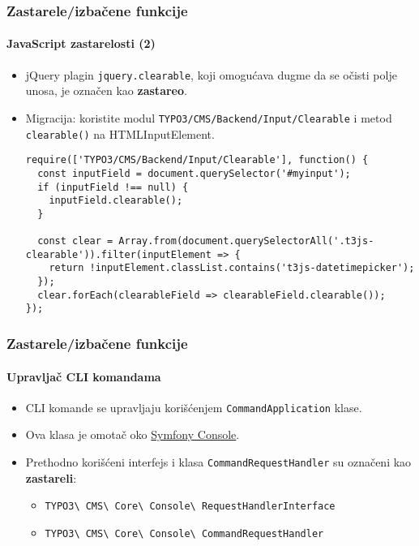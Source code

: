 
\begin{frame}[fragile]
	\frametitle{Zastarele/izbačene funkcije}
	\framesubtitle{JavaScript zastarelosti (2)}

	\lstset{basicstyle=\tiny\ttfamily}

	\begin{itemize}
		\item jQuery plagin \texttt{jquery.clearable}, koji omogućava dugme da se očisti
			polje unosa, je označen kao \textbf{zastareo}.
		\item Migracija: koristite modul \small\texttt{TYPO3/CMS/Backend/Input/Clearable}\normalsize 
			i metod \texttt{clearable()} na HTMLInputElement.

\begin{lstlisting}
require(['TYPO3/CMS/Backend/Input/Clearable'], function() {
  const inputField = document.querySelector('#myinput');
  if (inputField !== null) {
    inputField.clearable();
  }

  const clear = Array.from(document.querySelectorAll('.t3js-clearable')).filter(inputElement => {
    return !inputElement.classList.contains('t3js-datetimepicker');
  });
  clear.forEach(clearableField => clearableField.clearable());
});
\end{lstlisting}

	\end{itemize}

\end{frame}


\begin{frame}[fragile]
	\frametitle{Zastarele/izbačene funkcije}
	\framesubtitle{Upravljač CLI komandama}

	\begin{itemize}
		\item CLI komande se upravljaju korišćenjem \texttt{CommandApplication} klase.
		\item Ova klasa je omotač oko
			\href{https://symfony.com/doc/current/components/console.html}{Symfony Console}.

		\item Prethodno korišćeni interfejs i klasa \texttt{CommandRequestHandler} su označeni kao \textbf{zastareli}:

			\begin{itemize}
				\item
					\texttt{TYPO3\textbackslash
						CMS\textbackslash
						Core\textbackslash
						Console\textbackslash
						RequestHandlerInterface}
				\item
					\texttt{TYPO3\textbackslash
						CMS\textbackslash
						Core\textbackslash
						Console\textbackslash
						CommandRequestHandler}
			\end{itemize}

	\end{itemize}

\end{frame}

